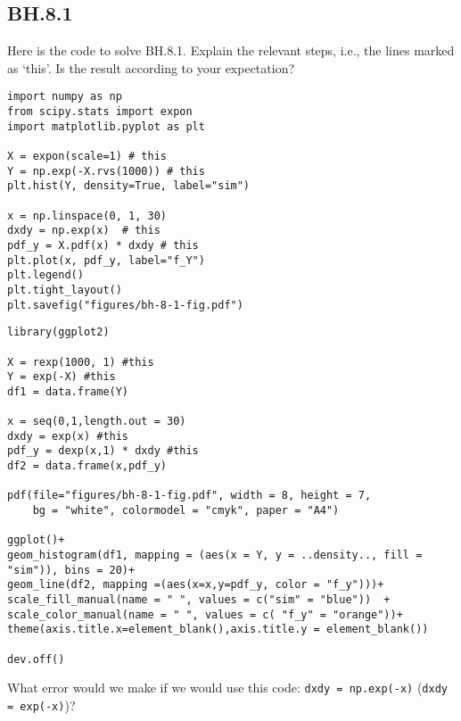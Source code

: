 

\subsection{BH.8.1}
\label{sec:bh-8.1}

\begin{exercise}
Here is the code to solve BH.8.1. Explain the relevant steps, i.e., the lines marked as `this'. Is the result according to your expectation?
\begin{verbatim}
import numpy as np
from scipy.stats import expon
import matplotlib.pyplot as plt

X = expon(scale=1) # this
Y = np.exp(-X.rvs(1000)) # this
plt.hist(Y, density=True, label="sim")

x = np.linspace(0, 1, 30)
dxdy = np.exp(x)  # this
pdf_y = X.pdf(x) * dxdy # this
plt.plot(x, pdf_y, label="f_Y")
plt.legend()
plt.tight_layout()
plt.savefig("figures/bh-8-1-fig.pdf")
\end{verbatim}

\begin{verbatim}
library(ggplot2)

X = rexp(1000, 1) #this
Y = exp(-X) #this
df1 = data.frame(Y)

x = seq(0,1,length.out = 30)
dxdy = exp(x) #this
pdf_y = dexp(x,1) * dxdy #this
df2 = data.frame(x,pdf_y)

pdf(file="figures/bh-8-1-fig.pdf", width = 8, height = 7, 
    bg = "white", colormodel = "cmyk", paper = "A4")   

ggplot()+
geom_histogram(df1, mapping = (aes(x = Y, y = ..density.., fill = "sim")), bins = 20)+
geom_line(df2, mapping =(aes(x=x,y=pdf_y, color = "f_y")))+
scale_fill_manual(name = " ", values = c("sim" = "blue"))  +
scale_color_manual(name = " ", values = c( "f_y" = "orange"))+
theme(axis.title.x=element_blank(),axis.title.y = element_blank())

dev.off()
\end{verbatim}

\end{exercise}

\begin{exercise}
What error would we make if we would use this code: \verb|dxdy = np.exp(-x)| (\verb|dxdy = exp(-x)|)?
\end{exercise}




